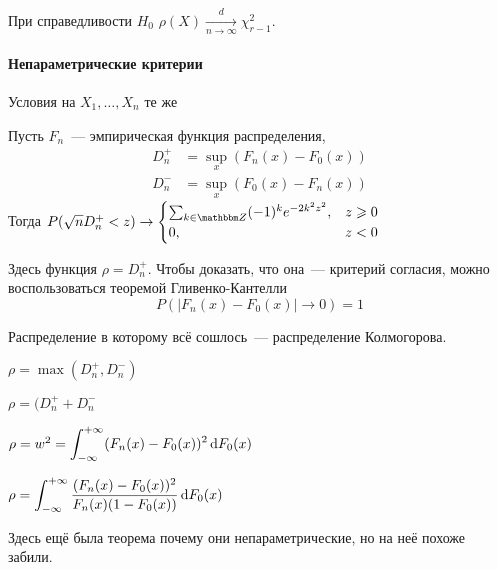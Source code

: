 \documentclass[12pt,timbord]{../../../notes}
\begin{document}
\begin{thrm}\label{thrm:stat::pirson::chi}
  При справедливости $H_0$ $\rho(X) \xrightarrow[n\to \infty]{d} \chi_{r-1}^2$.
\end{thrm}

\paragraph{Непараметрические критерии}
\label{par:stat::nonparcrit}
Условия на $X_1, \dotsc, X_n$ те же

\begin{prop}\label{prop:stat::nonparcrit::kolm}
  Пусть $F_n$~--- эмпирическая функция распределения, 
  \begin{align*}
    D_n^+ &= \sup_x (F_n(x) - F_0(x)) \\
    D_n^- &= \sup_x (F_0(x) - F_n(x)) 
  \end{align*}
  Тогда $P(\sqrt n D_n^+  < z) \to \displaystyle\begin{cases}
    \sum_{k\in \Z} (-1)^k e^{-2k^2 z^2}, &z \geqslant 0 \\
    0, &z < 0 \\
  \end{cases}$

  Здесь функция $\rho = D_n^+$. Чтобы доказать, что она~--- критерий согласия, можно
  воспользоваться теоремой Гливенко-Кантелли
  \[
    P(|F_n(x) - F_0(x) | \to 0 ) = 1
  \]

  Распределение в которому всё сошлось~--- распределение Колмогорова.
\end{prop}

\begin{prop}\label{prop:stat::nonparcrit::smir}
  $\rho = \max (D_n^+, D_n^-)$
\end{prop}
\begin{prop}\label{prop:stat::nonparcrit::koyg}
  $\rho = (D_n^+ + D_n^-$
\end{prop}
\begin{prop}\label{prop:stat::nonparcrit::omega}
  $\rho = w^2  = \displaystyle\int_{-\infty}^{+\infty} (F_n(x) - F_0(x))^2 \, \mathrm{d} F_0(x)$
\end{prop}
\begin{prop}\label{prop:stat::nonparcrit::andar}
  $\rho =  \displaystyle\int_{-\infty}^{+\infty} \frac{(F_n(x) - F_0(x))^2}{F_n(x) (1-F_0(x))} \, \mathrm{d} F_0(x)$
\end{prop}

Здесь ещё была теорема почему они непараметрические, но на неё похоже забили.
\end{document}
